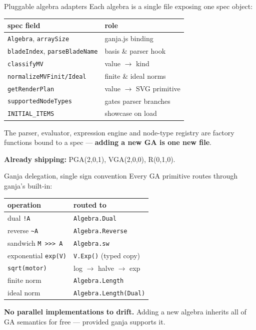 \documentclass[aspectratio=169,11pt]{beamer}
\begin{document}
\begin{frame}{Pluggable algebra adapters}
  Each algebra is a single file exposing one spec object:

  \begin{center}
  \begin{tabular}{ll}
    \toprule
    \textbf{spec field} & \textbf{role} \\
    \midrule
    \texttt{Algebra}, \texttt{arraySize} & ganja.js binding \\
    \texttt{bladeIndex}, \texttt{parseBladeName} & basis \& parser hook \\
    \texttt{classifyMV} & value \(\to\) kind \\
    \texttt{normalizeMVFinit/Ideal} & finite \& ideal norms \\
    \texttt{getRenderPlan} & value \(\to\) SVG primitive \\
    \texttt{supportedNodeTypes} & gates parser branches \\
    \texttt{INITIAL\_ITEMS} & showcase on load \\
    \bottomrule
  \end{tabular}
  \end{center}

  The parser, evaluator, expression engine and node-type registry are
  \alert{factory functions} bound to a spec — \textbf{adding a new GA is
  one new file}.

  \medskip
  \textbf{Already shipping:} PGA(2,0,1), VGA(2,0,0), R(0,1,0).
\end{frame}

\begin{frame}{Ganja delegation, single sign convention}
  Every GA primitive routes through ganja's built-in:

  \begin{center}
  \begin{tabular}{ll}
    \toprule
    \textbf{operation} & \textbf{routed to} \\
    \midrule
    dual \texttt{!A}            & \texttt{Algebra.Dual} \\
    reverse \texttt{\textasciitilde A} & \texttt{Algebra.Reverse} \\
    sandwich \texttt{M >>> A}   & \texttt{Algebra.sw} \\
    exponential \texttt{exp(V)} & \texttt{V.Exp()} (typed copy) \\
    \texttt{sqrt(motor)}        & log \(\to\) halve \(\to\) exp \\
    finite norm                 & \texttt{Algebra.Length} \\
    ideal norm                  & \texttt{Algebra.Length(Dual)} \\
    \bottomrule
  \end{tabular}
  \end{center}

  \medskip
  \textbf{No parallel implementations to drift.} Adding a new algebra
  inherits all of GA semantics for free — provided ganja supports it.
\end{frame}
\end{document}
